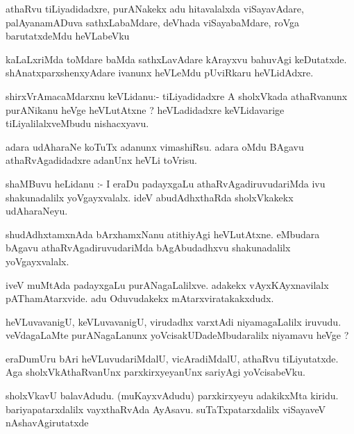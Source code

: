\documentclass{article}
\begin{document}
\begin{mn}
athaRvu  tiLiyadidadxre,  purANakekx  adu  hitavalalxda  viSayavAdare,  palAyanamADuva  sathxLabaMdare,  deVhada  viSayabaMdare,  
roVga  barutatxdeMdu  heVLabeVku
\end{mn}

\begin{mn}
kaLaLxriMda  toMdare  baMda  sathxLavAdare  kArayxvu  bahuvAgi  keDutatxde.  shAnatxparxshenxyAdare  ivanunx  heVLeMdu  pUviRkaru  heVLidAdxre.
\end{mn}

\begin{mn}
shirxVrAmacaMdarxnu  keVLidanu:- tiLiyadidadxre  A  sholxVkada  athaRvanunx  purANikanu  heVge  heVLutAtxne ?  heVLadidadxre  
keVLidavarige  tiLiyalilalxveMbudu  nishacxyavu.
\end{mn}

\begin{mn}
adara  udAharaNe  koTuTx  adanunx  vimashiRsu.  adara  oMdu  BAgavu  athaRvAgadidadxre  adanUnx  heVLi  toVrisu.
\end{mn}

\begin{mn}
shaMBuvu  heLidanu :- I  eraDu  padayxgaLu  athaRvAgadiruvudariMda  ivu  shakunadalilx  yoVgayxvalalx.  ideV  
abudAdhxthaRda  sholxVkakekx  udAharaNeyu.
\end{mn}

\begin{mn}
shudAdhxtamxnAda  bArxhamxNanu  atithiyAgi  heVLutAtxne.  eMbudara  bAgavu  athaRvAgadiruvudariMda  bAgAbudadhxvu  
shakunadalilx  yoVgayxvalalx.
\end{mn}

\begin{mn}
iveV  muMtAda  padayxgaLu  purANagaLalilxve.  adakekx  vAyxKAyxnavilalx  pAThamAtarxvide.  adu  Oduvudakekx  mAtarxviratakakxdudx.
\end{mn}

\begin{mn}
heVLuvavanigU,  keVLuvavanigU,  virudadhx  varxtAdi  niyamagaLalilx  iruvudu.  veVdagaLaMte  purANagaLanunx  yoVcisakUDadeMbudaralilx  
niyamavu  heVge ?
\end{mn}

\begin{mn}
eraDumUru  bAri  heVLuvudariMdalU,  vicAradiMdalU,  athaRvu  tiLiyutatxde.  Aga  sholxVkAthaRvanUnx  parxkirxyeyanUnx  sariyAgi  yoVcisabeVku.
\end{mn}

\begin{mn}
sholxVkavU  balavAdudu.  (muKayxvAdudu) parxkirxyeyu  adakikxMta  kiridu.  bariyapatarxdalilx  vayxthaRvAda  AyAsavu.  suTaTxpatarxdalilx  
viSayaveV  nAshavAgirutatxde
\end{mn}
\end{document}
